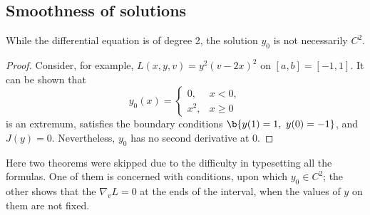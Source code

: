 \subsection{Smoothness of solutions}

\begin{remark}
  While the differential equation is of degree 2, the solution $y_0$ is not necessarily $C^2$.  
\end{remark}

\begin{proof}
  Consider, for example, $L(x, y, v) = y^2(v-2x)^2$ on $[a, b] = [-1, 1]$.
  It can be shown that
  $$ y_0(x) = 
  \begin{cases}
    0, & x < 0, \\
    x^2, & x\ge 0
  \end{cases}
  $$
  is an extremum, satisfies the boundary conditions $\b{y(1) = 1,\ y(0) = -1}$, and $J(y)=0$. Nevertheless, $y_0$ has no second derivative at 0.
\end{proof}

{\footnotesize Here two theorems were skipped due to the difficulty in typesetting all the formulas. One of them is concerned with conditions, upon which $y_0 \in C^2$; the other shows that the $\nabla_vL = 0$ at the ends of the interval, when the values of $y$ on them are not fixed.}

